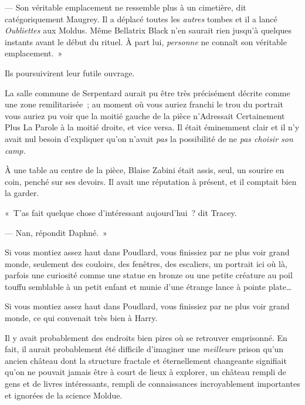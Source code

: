 --- Son véritable emplacement ne ressemble plus à un cimetière, dit catégoriquement Maugrey.
Il a déplacé toutes les \emph{autres} tombes et il a lancé \emph{Oubliettes} aux Moldus.
Même Bellatrix Black n'en saurait rien jusqu'à quelques instants avant le début du rituel.
À part lui, \emph{personne} ne connaît son véritable emplacement.~»

Ils poursuivirent leur futile ouvrage.


La salle commune de Serpentard aurait pu être très précisément décrite comme une zone remilitarisée~; au moment où vous auriez franchi le trou du portrait vous auriez pu voir que la moitié gauche de la pièce n'Adressait Certainement Plus La Parole à la moitié droite, et vice versa.
Il était éminemment clair et il n'y avait nul besoin d'expliquer qu'on n'avait \emph{pas} la possibilité de ne \emph{pas choisir son camp.}

À une table au centre de la pièce, Blaise Zabini était assis, seul, un sourire en coin, penché sur ses devoirs.
Il avait une réputation à présent, et il comptait bien la garder.




«~T'as fait quelque chose d'intéressant aujourd'hui~? dit Tracey.

--- Nan, répondit Daphné.~»


Si vous montiez assez haut dans Poudlard, vous finissiez par ne plus voir grand monde, seulement des couloirs, des fenêtres, des escaliers, un portrait ici où là, parfois une curiosité comme une statue en bronze ou une petite créature au poil touffu semblable à un petit enfant et munie d'une étrange lance à pointe plate…

Si vous montiez assez haut dans Poudlard, vous finissiez par ne plus voir grand monde, ce qui convenait très bien à Harry.

Il y avait probablement des endroits bien pires où se retrouver emprisonné.
En fait, il aurait probablement été difficile d'imaginer une \emph{meilleure} prison qu'un ancien château dont la structure fractale et éternellement changeante signifiait qu'on ne pouvait jamais être à court de lieux à explorer, un château rempli de gens et de livres intéressants, rempli de connaissances incroyablement importantes et ignorées de la science Moldue.

